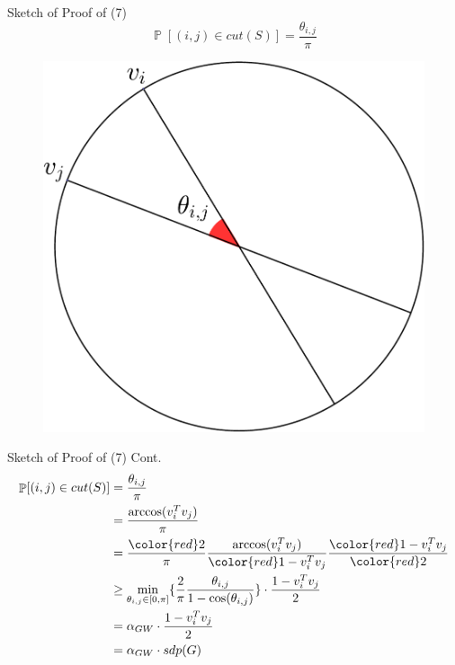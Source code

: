 \documentclass[10pt, xcolor={dvipsnames}]{beamer}
\DeclareMathOperator{\Prob}{\mathbb{P}}
\begin{document}
\begin{frame}{Sketch of Proof of (7)}
\begin{equation}
\Prob[(i, j) \in cut(S)] = \frac{\theta_{i, j}}{\pi}
\end{equation}

\begin{center}
\begin{figure}
\includegraphics[width=.5\textwidth]{../figures/hyperplane-rounding-crop.pdf}
\end{figure}
\end{center}
\end{frame}

\begin{frame}{Sketch of Proof of (7) Cont.}
\begin{align*}
\Prob[(i, j) \in cut(S)] &= \frac{\theta_{i, j}}{\pi} \\
&=\frac{\arccos(v_{i}^{T}v_{j})}{\pi}\\
&=\frac{\color{red}2}{\pi}\frac{\arccos(v_{i}^{T}v_{j})}{ {\color{red} 1 - v_{i}^{T}v_{j} }}  \frac{\color{red}1 - v_{i}^{T} v_{j} }{\color{red}2} \\
&\geq \min_{\theta_{i, j} \in [0, \pi]} \lbrace 
\frac{2}{\pi}\frac{\theta_{i, j}}{ { 1 - \cos(\theta_{i, j}) }} 
\rbrace \cdot
\frac{1 - v_{i}^{T} v_{j} }{2}\\
&= \alpha_{GW} \cdot \frac{1 - v_{i}^{T} v_{j} }{2}\\
&= \alpha_{GW} \cdot sdp(G)
\end{align*}
\end{frame}
\end{document}
